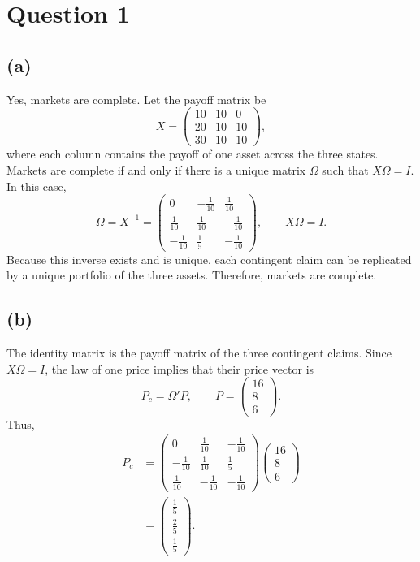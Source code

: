 
\section*{Question 1}

\subsection*{(a)}

Yes, markets are complete. Let the payoff matrix be
\[
X=
\begin{pmatrix}
10 & 10 & 0 \\
20 & 10 & 10 \\
30 & 10 & 10
\end{pmatrix},
\]
where each column contains the payoff of one asset across the three states.
Markets are complete if and only if there is a unique matrix $\Omega$ such that
$X\Omega=I$. In this case,
\[
\Omega=X^{-1}
=
\begin{pmatrix}
0 & -\frac{1}{10} & \frac{1}{10} \\
\frac{1}{10} & \frac{1}{10} & -\frac{1}{10} \\
-\frac{1}{10} & \frac{1}{5} & -\frac{1}{10}
\end{pmatrix},
\qquad
X\Omega=I.
\]
Because this inverse exists and is unique, each contingent claim can be
replicated by a unique portfolio of the three assets. Therefore, markets are
complete.

\subsection*{(b)}

The identity matrix is the payoff matrix of the three contingent claims. Since
$X\Omega=I$, the law of one price implies that their price vector is
\[
P_c=\Omega'P,
\qquad
P=
\begin{pmatrix}
16\\
8\\
6
\end{pmatrix}.
\]
Thus,
\begin{align*}
P_c
&=
\begin{pmatrix}
0 & \frac{1}{10} & -\frac{1}{10} \\
-\frac{1}{10} & \frac{1}{10} & \frac{1}{5} \\
\frac{1}{10} & -\frac{1}{10} & -\frac{1}{10}
\end{pmatrix}
\begin{pmatrix}
16\\
8\\
6
\end{pmatrix} \\
&=
\begin{pmatrix}
\frac{1}{5}\\
\frac{2}{5}\\
\frac{1}{5}
\end{pmatrix}.
\end{align*}

